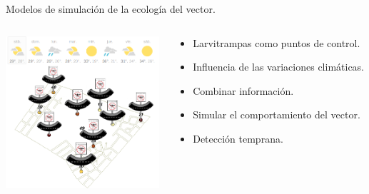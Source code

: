 \begin{frame}[t]{Modelos de simulación de la ecología del vector.}
  \begin{center}
   \begin{columns}[T]
        \begin{column}[T]{5.5cm}
             \includegraphics[width=5.7cm]{./graphics/larvitrmpas-clima.png}
        \end{column}
        \begin{column}[T]{5.5cm}
          \begin{itemize}
          \item Larvitrampas como puntos de control.
          \item Influencia de las variaciones climáticas.
          \item Combinar información.
          \item Simular el comportamiento del vector.
          \item Detección temprana.
          \end{itemize}
        \end{column}
    \end{columns}
  \end{center}
\end{frame}

